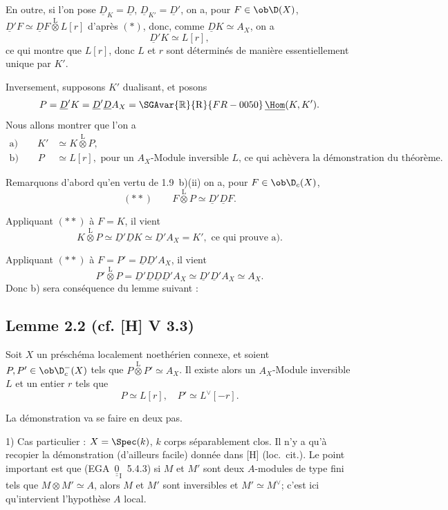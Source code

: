 En outre, si l'on pose $\underline{D}_K = \underline{D}$, $\underline{D}_{K'} = \underline{D}'$, on a, pour $F \in \ob \D(X)$, $\underline{D}'F \simeq \underline{D} F \mathop{\otimes}\limits^{\mathrm{L}} L[r]$ d'après $(*)$, donc, comme $\underline{D} K \simeq A_X$, on a
\[
\underline{D}' K \simeq L[r],
\]
ce qui montre que $L[r]$, donc $L$ et $r$ sont déterminés de manière essentiellement unique par $K'$.

Inversement, supposons $K'$ dualisant, et posons
\[
P = \underline{D}'K = \underline{D}'\underline{D} A_X = \SGAvar{\mathbb{R}}{\mathrm{R}}{FR-0050}\,\underline{\Hom}(K,K').
\]
Nous allons montrer que l'on a
\begin{align*}
\text{a)} \qquad K' &\simeq K \mathop{\otimes}\limits^{\mathrm{L}} P, \\
\text{b)} \qquad P &\simeq L[r], \text{ pour un $A_X$-Module inversible $L$, ce qui achèvera la démonstration du théorème.}
\end{align*}

Remarquons d'abord qu'en vertu de 1.9~b)(ii) on a, pour $F \in \ob \D_c(X)$,
\[
(**) \qquad F \mathop{\otimes}\limits^{\mathrm{L}} P \simeq \underline{D}'\underline{D} F.
\]

Appliquant $(**)$ à $F = K$, il vient
\[
K \mathop{\otimes}\limits^{\mathrm{L}} P \simeq \underline{D}'\underline{D} K \simeq \underline{D}' A_X = K', \text{ ce qui prouve a).}
\]

Appliquant $(**)$ à $F = P' = \underline{D}\underline{D}'A_X$, il vient
\[
P' \mathop{\otimes}\limits^{\mathrm{L}} P = \underline{D}'\underline{D}\underline{D}\underline{D}'A_X \simeq \underline{D}'\underline{D}'A_X \simeq A_X.
\]
Donc b) sera conséquence du lemme suivant :

\subsection*{Lemme 2.2 (cf. [H] V 3.3)}
Soit $X$ un préschéma localement noethérien connexe, et soient $P, P' \in \ob \D_c^{-}(X)$ tels que $P \mathop{\otimes}\limits^{\mathrm{L}} P' \simeq A_X$. Il existe alors un $A_X$-Module inversible $L$ et un entier $r$ tels que
\[
P \simeq L[r], \quad P' \simeq L^{\vee}[-r].
\]

La démonstration va se faire en deux pas.

1) Cas particulier : $X = \Spec(k)$, $k$ corps séparablement clos. Il n'y a qu'à recopier la démonstration (d'ailleurs facile) donnée dans [H] (loc.~cit.). Le point important est que (EGA~$\underline{\underline{0}}_{\mathrm{I}}$~5.4.3) si $M$ et $M'$ sont deux $A$-modules de type fini tels que $M \otimes M' \simeq A$, alors $M$ et $M'$ sont inversibles et $M' \simeq M^{\vee}$; c'est ici qu'intervient l'hypothèse $A$ local.

